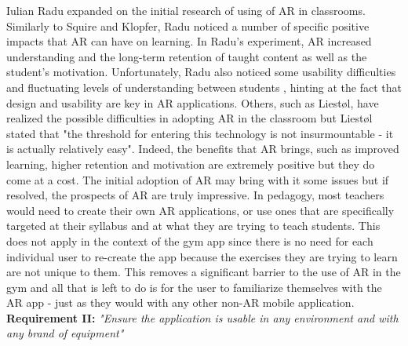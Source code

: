 \documentclass{l4proj}
\begin{document}
Iulian Radu expanded on the initial research of using of AR in classrooms. Similarly to Squire and Klopfer, Radu noticed a number of specific positive impacts that AR can have on learning. In Radu's experiment, AR increased understanding and the long-term retention of taught content as well as the student's motivation\cite{radu_why_2012}. Unfortunately, Radu also noticed some usability difficulties and fluctuating levels of understanding between students \cite{radu_why_2012}, hinting at the fact that design and usability are key in AR applications. Others, such as Liestøl, have realized the possible difficulties in adopting AR in the classroom but Liestøl stated that "the threshold for entering this technology is not insurmountable - it is actually relatively easy"\cite{liestol_learning_2011}. Indeed, the benefits that AR brings, such as improved learning, higher retention and motivation are extremely positive but they do come at a cost. The initial adoption of AR may bring with it some issues but if resolved, the prospects of AR are truly impressive. In  pedagogy, most teachers would need to create their own AR applications, or use ones that are specifically targeted at their syllabus and at what they are trying to teach students. This does not apply in the context of the gym app since there is no need for each individual user to re-create the app because the exercises they are trying to learn are not unique to them. This removes a significant barrier to the use of AR in the gym and all that is left to do is for the user to familiarize themselves with the AR app - just as they would with any other non-AR mobile application. 
\textbf{Requirement II:} \textit{"Ensure the application is usable in any environment and with any brand of equipment"}  \label{requirement_II}
\end{document}
